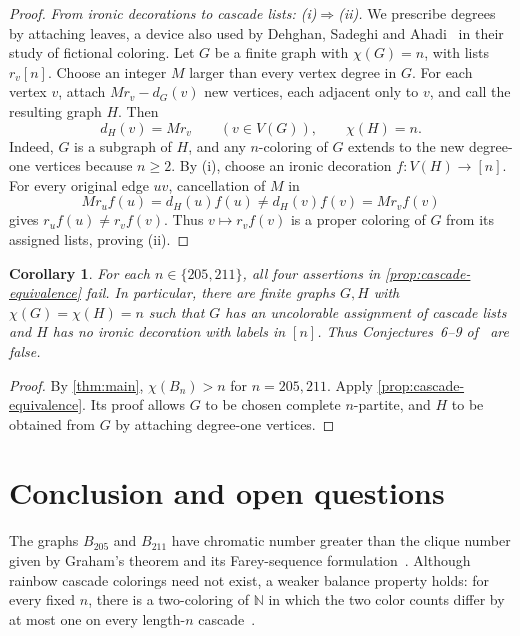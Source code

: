 \documentclass[11pt,reqno]{amsart}
\newcommand{\N}{\mathbb N}
\newtheorem{corollary}[theorem]{Corollary}
\theoremstyle{definition}
\theoremstyle{remark}
\numberwithin{equation}{section}
\begin{document}
\begin{proof}
\emph{From ironic decorations to cascade lists: \textup{(i)}$\Rightarrow$\textup{(ii)}.}
We prescribe degrees by attaching leaves, a device also used by
Dehghan, Sadeghi and Ahadi~\cite{DSA} in their study of fictional coloring.
Let $G$ be a finite graph with $\chi(G)=n$, with lists $r_v[n]$.
Choose an integer $M$ larger than every vertex degree in $G$.
For each vertex $v$, attach $Mr_v-d_G(v)$ new vertices, each adjacent
only to $v$, and call the resulting graph $H$. Then
\[
 d_H(v)=Mr_v\qquad(v\in V(G)),\qquad \chi(H)=n.
\]
Indeed, $G$ is a subgraph of $H$, and any $n$-coloring of $G$ extends
to the new degree-one vertices because $n\ge2$.
By \textup{(i)}, choose an ironic decoration $f:V(H)\to[n]$.
For every original edge $uv$, cancellation of $M$ in
\[
 Mr_uf(u)=d_H(u)f(u)\ne d_H(v)f(v)=Mr_vf(v)
\]
gives $r_uf(u)\ne r_vf(v)$. Thus $v\mapsto r_vf(v)$ is a proper
coloring of $G$ from its assigned lists, proving \textup{(ii)}.
\end{proof}

\begin{corollary}\label{cor:decorations}
For each $n\in\{205,211\}$, all four assertions in
\cref{prop:cascade-equivalence} fail. In particular, there are finite
graphs $G,H$ with $\chi(G)=\chi(H)=n$ such that $G$ has an uncolorable
assignment of cascade lists and $H$ has no ironic decoration with
labels in $[n]$. Thus Conjectures~6--9 of~\cite{Gryt} are false.
\end{corollary}

\begin{proof}
By \cref{thm:main}, $\chi(B_n)>n$ for $n=205,211$.
Apply \cref{prop:cascade-equivalence}. Its proof allows $G$ to be
chosen complete $n$-partite, and $H$ to be obtained from $G$ by
attaching degree-one vertices.
\end{proof}

\section{Conclusion and open questions}\label{sec:conclusion}

The graphs $B_{205}$ and $B_{211}$ have chromatic number greater
than the clique number given by Graham's theorem and its Farey-sequence
formulation~\cite{BS,Wang}. Although rainbow cascade colorings need
not exist, a weaker balance property holds:
for every fixed $n$, there is a two-coloring of $\N$ in which the two
color counts differ by at most one on every length-$n$
cascade~\cite[Theorem~1]{BG}.
\end{document}
